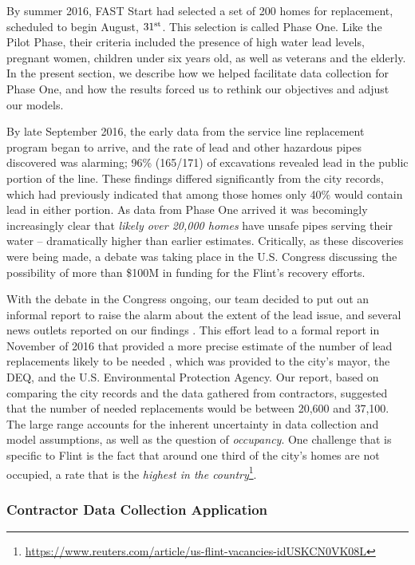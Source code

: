 \documentclass[sigconf]{acmart}
\begin{document}
By summer 2016, FAST Start had selected a set of 200 homes for replacement, scheduled to begin August, $31^{\rm st}$.  This selection is called Phase One. Like the Pilot Phase, their criteria included the presence of high water lead levels, pregnant women, children under six years old, as well as veterans and the elderly. In the present section, we describe how we helped facilitate data collection for Phase One, and how the results forced us to rethink our objectives and adjust our models. 

By late September 2016, the early data from the service line replacement program began to arrive, and the rate of lead and other hazardous pipes discovered was alarming; 96\% (165/171) of excavations revealed lead in the public portion of the line. These findings differed significantly from the city records, which had previously indicated that among those homes only 40\% would contain lead in either portion. As data from Phase One arrived it was becomingly increasingly clear that \emph{likely over 20,000 homes} have unsafe pipes serving their water -- dramatically higher than earlier estimates. Critically, as these discoveries were being made, a debate was taking place in the U.S. Congress discussing the possibility of more than \$100M in funding for the Flint's recovery efforts.

With the debate in the Congress ongoing, our team decided to put out an informal report to raise the alarm about the extent of the lead issue, and several news outlets reported on our findings \citep[e.g.][]{MRadio-Flintmighthave:url,FarmoreFlinthomes:url}. This effort lead to a formal report in November of 2016 that provided a more precise estimate of the number of lead replacements likely to be needed \citep{CityOfFlint:url}, which was provided to the city's mayor, the DEQ, and the U.S. Environmental Protection Agency. Our report, based on comparing the city records and the data gathered from contractors, suggested that the number of needed replacements would be between 20,600 and 37,100. The large range accounts for the inherent uncertainty in data collection and model assumptions, as well as the question of \emph{occupancy}. One challenge that is specific to Flint is the fact that around one third of the city's homes are not occupied, a rate that is the \emph{highest in the country}\footnote{\url{https://www.reuters.com/article/us-flint-vacancies-idUSKCN0VK08L}}.

\subsubsection{Contractor Data Collection Application} \label{sec:collection}
\end{document}
